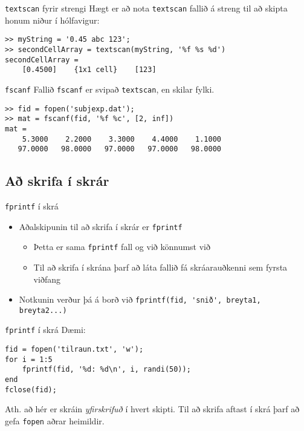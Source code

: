 \documentclass{beamer}
\begin{document}
\begin{frame}[fragile]{\texttt{textscan} fyrir strengi}
Hægt er að nota \texttt{textscan} fallið á streng til að skipta honum niður í hólfavigur:
\begin{verbatim}
>> myString = '0.45 abc 123';
>> secondCellArray = textscan(myString, '%f %s %d')
secondCellArray = 
    [0.4500]    {1x1 cell}    [123]
\end{verbatim}
\end{frame}

\begin{frame}[fragile]{\texttt{fscanf}}
Fallið \texttt{fscanf} er svipað \texttt{textscan}, en skilar fylki.

\begin{verbatim}
>> fid = fopen('subjexp.dat');
>> mat = fscanf(fid, '%f %c', [2, inf])
mat =
    5.3000    2.2000    3.3000    4.4000    1.1000
   97.0000   98.0000   97.0000   97.0000   98.0000
\end{verbatim}


\end{frame}


\subsection{Að skrifa í skrár}

\begin{frame}[fragile]{\texttt{fprintf} í skrá}
\begin{itemize}
 \item Aðalskipunin til að skrifa í skrár er \texttt{fprintf}
 \begin{itemize}
  \item Þetta er sama \texttt{fprintf} fall og við könnumst við
  \item Til að skrifa í skrána þarf að láta fallið fá skráarauðkenni sem fyrsta viðfang
 \end{itemize}
 \item Notkunin verður þá á borð við \verb|fprintf(fid, 'snið', breyta1, breyta2...)|
\end{itemize}
\end{frame}

\begin{frame}[fragile]{\texttt{fprintf} í skrá}
Dæmi:
\begin{verbatim}
fid = fopen('tilraun.txt', 'w');
for i = 1:5
    fprintf(fid, '%d: %d\n', i, randi(50));
end
fclose(fid);
\end{verbatim}
Ath. að hér er skráin \emph{yfirskrifuð} í hvert skipti. Til að skrifa aftast í skrá þarf að gefa \texttt{fopen} aðrar heimildir.
\end{frame}
\end{document}
